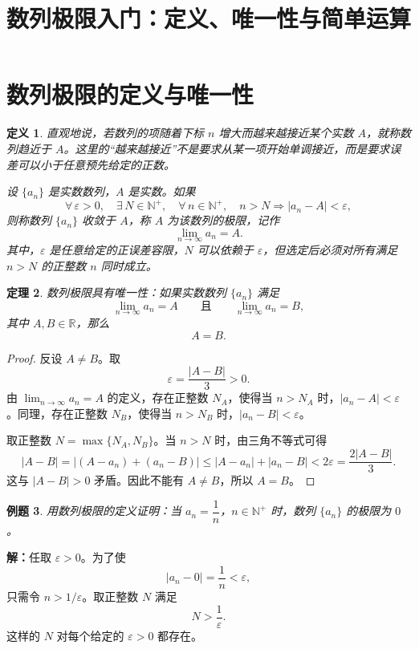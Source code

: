 \documentclass[UTF8,fontset=fandol,11pt]{ctexart}
\title{数列极限入门：定义、唯一性与简单运算}
\date{}
\newtheorem{definition}{定义}[section]
\newtheorem{theorem}[definition]{定理}
\newtheorem{example}[definition]{例题}
\begin{document}
\maketitle
\section{数列极限的定义与唯一性}\label{sec:S01}
\begin{definition}
直观地说，若数列的项随着下标 $n$ 增大而越来越接近某个实数 $A$，就称数列趋近于 $A$。这里的“越来越接近”不是要求从某一项开始单调接近，而是要求误差可以小于任意预先给定的正数。\label{def:sequence-limit}

设 $\{a_n\}$ 是实数数列，$A$ 是实数。如果
\[
\forall\,\varepsilon>0,\quad \exists\,N\in\mathbb{N}^+,\quad \forall\,n\in\mathbb{N}^+,\quad n>N\Longrightarrow |a_n-A|<\varepsilon,
\]
则称数列 $\{a_n\}$ 收敛于 $A$，称 $A$ 为该数列的极限，记作
\[
\lim_{n\to\infty}a_n=A.
\]
其中，$\varepsilon$ 是任意给定的正误差容限，$N$ 可以依赖于 $\varepsilon$，但选定后必须对所有满足 $n>N$ 的正整数 $n$ 同时成立。
\end{definition}
\begin{theorem}
数列极限具有唯一性：如果实数数列 $\{a_n\}$ 满足
\[
\lim_{n\to\infty}a_n=A\qquad\text{且}\qquad \lim_{n\to\infty}a_n=B,
\]
其中 $A,B\in\mathbb{R}$，那么
\[
A=B.
\]
\label{thm:limit-uniqueness}
\end{theorem}
\begin{proof}
反设 $A\ne B$。取
\[
\varepsilon=\frac{|A-B|}{3}>0.
\]
由 $\lim_{n\to\infty}a_n=A$ 的定义，存在正整数 $N_A$，使得当 $n>N_A$ 时，$|a_n-A|<\varepsilon$。同理，存在正整数 $N_B$，使得当 $n>N_B$ 时，$|a_n-B|<\varepsilon$。

取正整数 $N=\max\{N_A,N_B\}$。当 $n>N$ 时，由三角不等式可得
\[
|A-B|=|(A-a_n)+(a_n-B)|
\leq |A-a_n|+|a_n-B|
<2\varepsilon=\frac{2|A-B|}{3}.
\]
这与 $|A-B|>0$ 矛盾。因此不能有 $A\ne B$，所以 $A=B$。
\end{proof}
\begin{example}
用数列极限的定义证明：当 $a_n=\dfrac{1}{n}$，$n\in\mathbb{N}^+$ 时，数列 $\{a_n\}$ 的极限为 $0$。
\end{example}
\par\noindent\textbf{解：}任取 $\varepsilon>0$。为了使
\[
\left|a_n-0\right|=\frac{1}{n}<\varepsilon,
\]
只需令 $n>1/\varepsilon$。取正整数 $N$ 满足
\[
N>\frac{1}{\varepsilon}.
\]
这样的 $N$ 对每个给定的 $\varepsilon>0$ 都存在。
\end{document}
